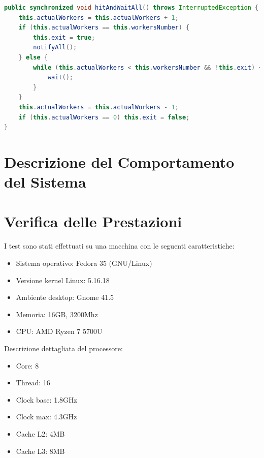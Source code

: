 \documentclass[12pt,a4paper,openright,twoside]{book}
\begin{document}
\begin{lstlisting}[float,
					language=Java,
					label=lst:lst3,caption=Implementazione della barrier]
public synchronized void hitAndWaitAll() throws InterruptedException {
	this.actualWorkers = this.actualWorkers + 1;
	if (this.actualWorkers == this.workersNumber) {
		this.exit = true;
		notifyAll();
	} else {
		while (this.actualWorkers < this.workersNumber && !this.exit) {
			wait();
		}
	}
	this.actualWorkers = this.actualWorkers - 1;
	if (this.actualWorkers == 0) this.exit = false;
}
\end{lstlisting}

\chapter{Descrizione del Comportamento del Sistema} %
\label{chap:Descrizione del Comportamento del Sistema}

\chapter{Verifica delle Prestazioni} %
\label{chap:Verifica delle Prestazioni}

I test sono stati effettuati su una macchina con le seguenti caratteristiche:
\begin{itemize}
	\item Sistema operativo: Fedora 35 (GNU/Linux)
	\item Versione kernel Linux: 5.16.18
	\item Ambiente desktop: Gnome 41.5
	\item Memoria: 16GB, 3200Mhz
	\item CPU: AMD Ryzen 7 5700U
\end{itemize}
Descrizione dettagliata del processore:
\begin{itemize}
	\item Core: 8
	\item Thread: 16
	\item Clock base: 1.8GHz
	\item Clock max: 4.3GHz
	\item Cache L2: 4MB
	\item Cache L3: 8MB
\end{itemize}
\end{document}
